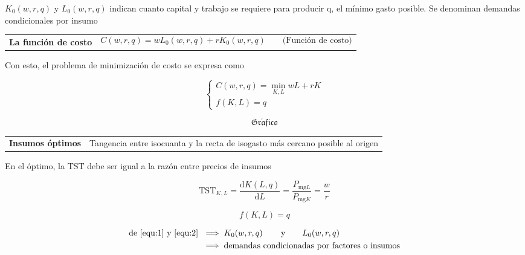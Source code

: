 \documentclass{report}
\newcommand{\GRAF}{\begin{center}$$\mathfrak{Gr\acute{a}fico}$$\end{center}}
\newenvironment{definition}[1]{\begin{center}
\begin{tabular}{p{3.5cm} p{12.5cm}}
\textbf{#1} &
}
{\\ \end{tabular}\end{center}}
\begin{document}
$K_0\!\left( w,r,q \right) $ y $L_0\!\left( w,r,q \right) $ indican cuanto capital y trabajo se requiere para producir q, el mínimo gasto posible. Se denominan demandas condicionales por insumo

\begin{definition}{La función de costo}
\[
    C\!\left( w,r,q \right) = wL_0\!\left( w,r,q \right) + rK_0\!\left( w,r,q \right) \qquad \text{(Función de costo)}
\] 
    \end{definition}

Con esto, el problema de minimización de costo se expresa como

\[
    \begin{cases}
        C\!\left( w,r,q \right) = \min\limits_{K,L} wL + rK\\
        f\!\left( K,L \right) = q
    \end{cases} 
    \]

\GRAF

\begin{definition}{Insumos óptimos}
    Tangencia entre isocuanta y la recta de isogasto más cercano posible al origen
\end{definition}

En el óptimo, la $\mathrm{TST}$ debe ser igual a la razón entre precios de insumos

\begin{equation}\label{equ:1}
\mathrm{TST}_{K,L} = \dfrac{\mathrm{d}K\!\left( L,q \right) }{\mathrm{d}L} = \dfrac{P_{\text{mg}L}}{P_{\text{mg}K}} = \dfrac{w}{r}
\end{equation}

\begin{equation}\label{equ:2}
f\!\left( K,L \right) = q
\end{equation}

\begin{align*}
    \text{de \ref{equ:1} y \ref{equ:2} } &\implies K_0\!\left( w,r,q \right)\qquad\text{y}\qquad L_0\!\left( w,r,q \right) \\
    &\implies \text{demandas condicionadas por factores o insumos}
\end{align*}

\newpage
\end{document}
